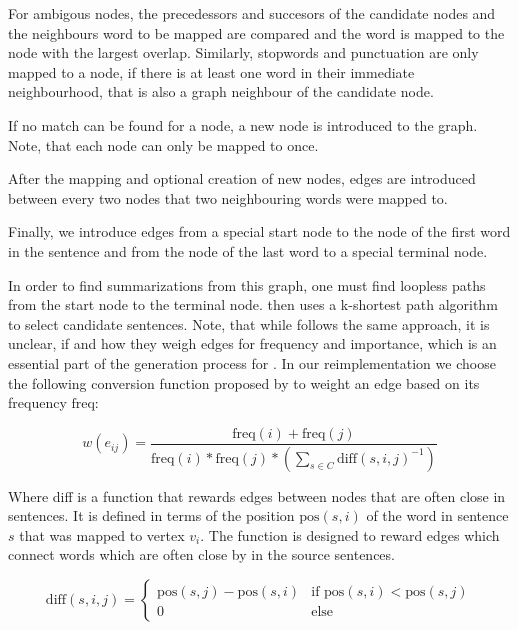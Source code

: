 \documentclass[a4paper,BCOR=10mm]{report}
\begin{document}
For ambigous nodes, the precedessors and succesors of the candidate nodes and the neighbours word to be mapped are compared and the word is mapped to the node with the largest overlap.
Similarly, stopwords and punctuation are only mapped to a node, if there is at least one word in their immediate neighbourhood, that is also a graph neighbour of the candidate node.

If no match can be found for a node, a new node is introduced to the graph. Note, that each node can only be mapped to once.

After the mapping and optional creation of new nodes, edges are introduced between every two nodes that two neighbouring words were mapped to.

Finally, we introduce edges from a special start node to the node of the first word in the sentence and from the node of the last word to a special terminal node.

In order to find summarizations from this graph, one must find loopless paths from the start node to the terminal node. \citeauthor{fillipova} then uses a k-shortest path algorithm to select candidate sentences. Note, that while \citeauthor{banerjee} follows the same approach, it is unclear, if and how they weigh edges for frequency and importance, which is an essential part of the generation process for \citeauthor{fillipova}.
In our reimplementation we choose the following conversion function proposed by \citeauthor{fillipova} to weight an edge based on its frequency $\text{freq}$:

\begin{displaymath}
w(e_{ij}) = \frac{\text{freq}(i) + \text{freq}(j)} {\text{freq}(i) * \text{freq}(j) * (\sum_{s \in C} \text{diff}(s, i, j)^{-1})}
\end{displaymath}

Where diff is a function that rewards edges between nodes that are often close in sentences. It is defined in terms of the position $\text{pos}(s, i)$ of the word in sentence $s$ that was mapped to vertex $v_i$.
The function is designed to reward edges which connect words which are often close by in the source sentences.

\begin{displaymath}
\text{diff}(s, i, j) = \begin{cases}
\text{pos}(s, j) - \text{pos}(s, i) & \text{if }\text{pos}(s, i) < \text{pos}(s, j) \\
0 & \text{else}
\end{cases}
\end{displaymath}
\end{document}
